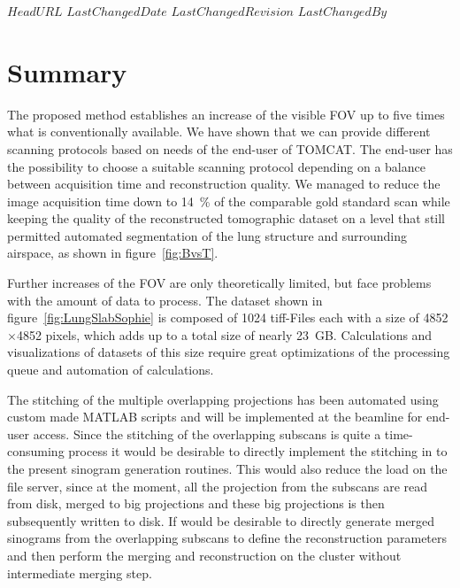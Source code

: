 \svnidlong
{$HeadURL$}
{$LastChangedDate$}
{$LastChangedRevision$}
{$LastChangedBy$}

\ifhtml
\else
\begin{center}
\end{center}
\fi

\section{Summary}
The proposed method establishes an increase of the visible FOV up to five times what is conventionally available. We have shown that we can provide different scanning protocols based on needs of the end-user of TOMCAT. The end-user has the possibility to choose a suitable scanning protocol depending on a balance between acquisition time and reconstruction quality. We managed to reduce the image acquisition time down to \SI{14}{\percent} of the comparable gold standard scan while keeping the quality of the reconstructed tomographic dataset on a level that still permitted automated segmentation of the lung structure and surrounding airspace, as shown in figure~\ref{fig:BvsT}.

Further increases of the FOV are only theoretically limited, but face problems with the amount of data to process. The dataset shown in figure~\ref{fig:LungSlabSophie} is composed of 1024 tiff-Files each with a size of 4852\(\times\)4852 pixels, which adds up to a total size of nearly \SI{23}{\giga B}. Calculations and visualizations of datasets of this size require great optimizations of the processing queue and automation of calculations.

The stitching of the multiple overlapping projections has been automated using custom made MATLAB scripts and will be implemented at the beamline for end-user access. Since the stitching of the overlapping subscans is quite a time-consuming process it would be desirable to directly implement the stitching in to the present sinogram generation routines. This would also reduce the load on the file server, since at the moment, all the projection from the subscans are read from disk, merged to big projections and these big projections is then subsequently written to disk. If would be desirable to directly generate merged sinograms from the overlapping subscans to define the reconstruction parameters and then perform the merging and reconstruction on the cluster without intermediate merging step.

